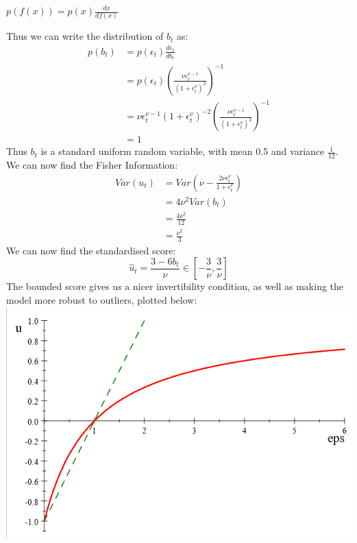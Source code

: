 \documentclass[DIV=14,titlepage=false]{scrreprt}
\begin{document}
\begin{lemma}
    $
        p(f(x)) = p(x) \frac{dx}{df(x)}
    $
\end{lemma}
Thus we can write the distribution of $b_t$ as:
\begin{align*}
    p(b_t) &= p(\epsilon_t) \frac{d\epsilon_t}{db_t}\\
    &= p(\epsilon_t) \left(\frac{\nu \epsilon_t^{\nu-1}}{(1+\epsilon_t^\nu)^2}\right)^{-1}\\
    &= \nu \epsilon_t^{\nu-1}(1+\epsilon_t^\nu)^{-2} \left(\frac{\nu \epsilon_t^{\nu-1}}{(1+\epsilon_t^\nu)^2}\right)^{-1}\\
    &= 1
\end{align*}
Thus $b_t$ is a standard uniform random variable, with mean 0.5 and variance $\frac{1}{12}$. We can now find the Fisher Information:
\begin{align*}
    Var(u_t) &= Var \left(\nu - \frac{2\nu \epsilon_t^{\nu}}{1+\epsilon_t^\nu}\right)\\
    &= 4\nu^2 Var(b_t)\\
    &= \frac{4\nu^2}{12}\\
    &= \frac{\nu^2}{3}
\end{align*}
We can now find the standardised score:
\[
    \hat u_t = \frac{3-6b_t}{\nu} \in \left[-\frac{3}{\nu}, \frac{3}{\nu}\right]
\]
The bounded score gives us a nicer invertibility condition, as well as making the model more robust to outliers, plotted below:\\
\includegraphics[width=\textwidth]{./Images/Log-Logistic Score.png}
\end{document}
